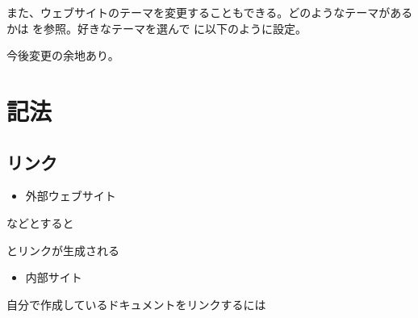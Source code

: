 \documentclass[letterpaper,10pt,dvipdfmx,report]{sphinxmanual}
\begin{document}
また、ウェブサイトのテーマを変更することもできる。どのようなテーマがあるかは
を参照。好きなテーマを選んで  に以下のように設定。

\begin{sphinxVerbatim}[commandchars=\\\{\}]
  
    
\end{sphinxVerbatim}

今後変更の余地あり。


\section{記法}
\label{\detokenize{sphinx:id6}}

\subsection{リンク}
\label{\detokenize{sphinx:id7}}\begin{itemize}
\item {} 
外部ウェブサイト

\end{itemize}

\begin{sphinxVerbatim}[commandchars=\\\{\}]
\end{sphinxVerbatim}

などとすると
\begin{quote}

\end{quote}

とリンクが生成される
\begin{itemize}
\item {} 
内部サイト

\end{itemize}

自分で作成しているドキュメントをリンクするには

\begin{sphinxVerbatim}[commandchars=\\\{\}]
\end{sphinxVerbatim}
\end{document}

